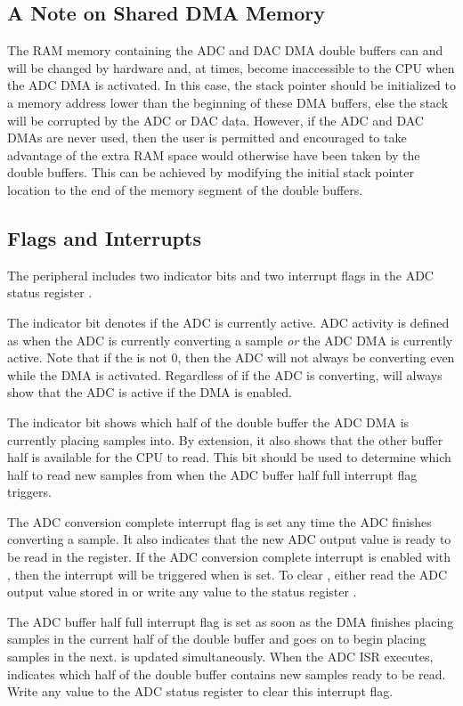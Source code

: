 \subsection{A Note on Shared DMA Memory}

The RAM memory containing the ADC and DAC DMA double buffers can and will be changed by hardware and, at times, become inaccessible to the CPU when the ADC DMA is activated. In this case, the stack pointer should be initialized to a memory address lower than the beginning of these DMA buffers, else the stack will be corrupted by the ADC or DAC data. However, if the ADC and DAC DMAs are never used, then the user is permitted and encouraged to take advantage of the extra RAM space would otherwise have been taken by the double buffers. This can be achieved by modifying the initial stack pointer location to the end of the memory segment of the double buffers.



\subsection{Flags and Interrupts}

The  peripheral includes two indicator bits and two interrupt flags in the ADC status register .

The  indicator bit denotes if the ADC is currently active. ADC activity is defined as when the ADC is currently converting a sample \textit{or} the ADC DMA is currently active. Note that if the  is not 0, then the ADC will not always be converting even while the DMA is activated. Regardless of if the ADC is converting,  will always show that the ADC is active if the DMA is enabled.

The  indicator bit shows which half of the double buffer the ADC DMA is currently placing samples into. By extension, it also shows that the other buffer half is available for the CPU to read. This bit should be used to determine which half to read new samples from when the ADC buffer half full interrupt flag  triggers.

The ADC conversion complete interrupt flag  is set any time the ADC finishes converting a sample. It also indicates that the new ADC output value is ready to be read in the  register. If the ADC conversion complete interrupt is enabled with , then the  interrupt will be triggered when  is set. To clear , either read the ADC output value stored in  or write any value to the status register .

The ADC buffer half full interrupt flag  is set as soon as the DMA finishes placing samples in the current half of the double buffer and goes on to begin placing samples in the next.  is updated simultaneously. When the ADC ISR executes,  indicates which half of the double buffer contains new samples ready to be read. Write any value to the ADC status register  to clear this interrupt flag.
